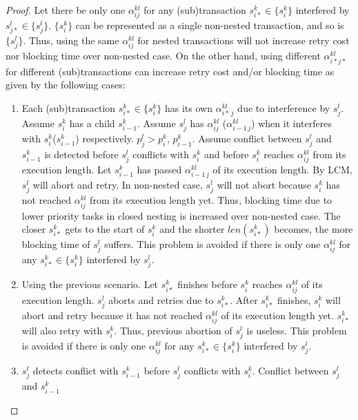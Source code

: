 \documentclass[letter]{sig-alternate}
\begin{document}
\begin{proof}

Let there be only one $\alpha_{ij}^{kl}$
for any (sub)transaction $s_{i*}^{k}\in\{s_{i}^{k}\}$ interfered
by $s_{j*}^{l}\in\{s_{j}^{l}\}$. $\{s_{i}^{k}\}$ can be represented
as a single non-nested transaction, and so is $\{s_{j}^{l}\}$. Thus,
using the same $\alpha_{ij}^{kl}$ for nested transactions will not
increase retry cost nor blocking time over non-nested case. On the
other hand, using different $\alpha_{i*j*}^{kl}$ for different (sub)transactions
can increase retry cost and/or blocking time as given by the following
cases:
\begin{enumerate}
\item Each (sub)transaction $s_{i*}^{k}\in\{s_{i}^{k}\}$ has its own $\alpha_{i*\, j}^{kl}$
due to interference by $s_{j}^{l}$. Assume $s_{i}^{k}$ has a child
$s_{i-1}^{k}$. Assume $s_{j}^{l}$ has $\alpha_{ij}^{kl}$ ($\alpha_{i-1\, j}^{kl}$)
when it interferes with $s_{i}^{k}$($s_{i-1}^{k}$) respectively.
$p_{j}^{l}>p_{i}^{k},\, p_{i-1}^{k}$. Assume conflict between $s_{j}^{l}$
and $s_{i-1}^{k}$ is detected before $s_{j}^{l}$ conflicts with
$s_{i}^{k}$ and before $s_{i}^{k}$ reaches $\alpha_{ij}^{kl}$ from
its execution length. Let $s_{i-1}^{k}$ has passed $\alpha_{i-1\, j}^{kl}$
of its execution length. By LCM, $s_{j}^{l}$ will abort and retry.
In non-nested case, $s_{j}^{l}$ will not abort because $s_{i}^{k}$
has not reached $\alpha_{ij}^{kl}$ from its execution length yet.
Thus, blocking time due to lower priority tasks in closed nesting
is increased over non-nested case. The closer $s_{i*}^{k}$ gets to
the start of $s_{i}^{k}$ and the shorter $len(s_{i*}^{k})$ becomes,
the more blocking time of $s_{j}^{l}$ suffers. This problem is avoided
if there is only one $\alpha_{ij}^{kl}$ for any $s_{i*}^{k}\in\{s_{i}^{k}\}$
interfered by $s_{j}^{l}$.
\item Using the previous scenario. Let $s_{i*}^{k}$ finishes before $s_{i}^{k}$
reaches $\alpha_{ij}^{kl}$ of its execution length. $s_{j}^{l}$
aborts and retries due to $s_{i*}^{k}$. After $s_{i*}^{k}$ finishes,
$s_{i}^{k}$ will abort and retry because it has not reached $\alpha_{ij}^{kl}$
of its execution length yet. $s_{i*}^{k}$ will also retry with $s_{i}^{k}$.
Thus, previous abortion of $s_{j}^{l}$ is useless. This problem is
avoided if there is only one $\alpha_{ij}^{kl}$ for any $s_{i*}^{k}\in\{s_{i}^{k}\}$
interfered by $s_{j}^{l}$.
\item $s_{j}^{l}$ detects conflict with $s_{i-1}^{k}$ before $s_{j}^{l}$
conflicts with $s_{i}^{k}$. Conflict between $s_{j}^{l}$ and $s_{i-1}^{k}$

\end{enumerate}
\end{proof}
\end{document}
